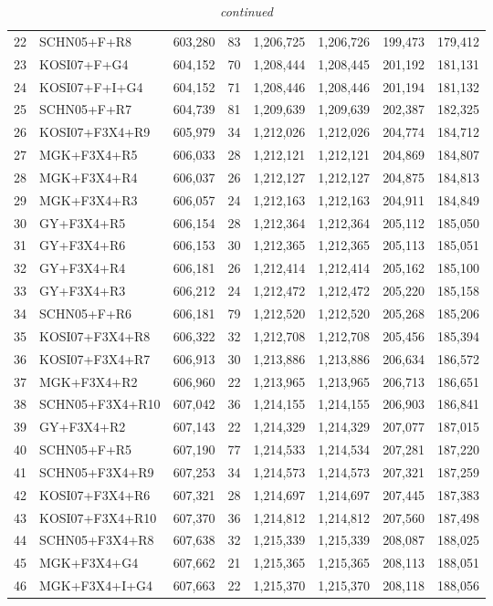 \begin{table}
\begin{longtable}{rlrrrrrr}
22&SCHN05+F+R8&603,280&83&1,206,725&1,206,726&199,473&179,412\\
23&KOSI07+F+G4&604,152&70&1,208,444&1,208,445&201,192&181,131\\
24&KOSI07+F+I+G4&604,152&71&1,208,446&1,208,446&201,194&181,132\\
25&SCHN05+F+R7&604,739&81&1,209,639&1,209,639&202,387&182,325\\
26&KOSI07+F3X4+R9&605,979&34&1,212,026&1,212,026&204,774&184,712\\
27&MGK+F3X4+R5&606,033&28&1,212,121&1,212,121&204,869&184,807\\
28&MGK+F3X4+R4&606,037&26&1,212,127&1,212,127&204,875&184,813\\
29&MGK+F3X4+R3&606,057&24&1,212,163&1,212,163&204,911&184,849\\
30&GY+F3X4+R5&606,154&28&1,212,364&1,212,364&205,112&185,050\\
\hline 
\caption[]{\emph{continued}}
31&GY+F3X4+R6&606,153&30&1,212,365&1,212,365&205,113&185,051\\
32&GY+F3X4+R4&606,181&26&1,212,414&1,212,414&205,162&185,100\\
33&GY+F3X4+R3&606,212&24&1,212,472&1,212,472&205,220&185,158\\
34&SCHN05+F+R6&606,181&79&1,212,520&1,212,520&205,268&185,206\\
35&KOSI07+F3X4+R8&606,322&32&1,212,708&1,212,708&205,456&185,394\\
36&KOSI07+F3X4+R7&606,913&30&1,213,886&1,213,886&206,634&186,572\\
37&MGK+F3X4+R2&606,960&22&1,213,965&1,213,965&206,713&186,651\\
38&SCHN05+F3X4+R10&607,042&36&1,214,155&1,214,155&206,903&186,841\\
39&GY+F3X4+R2&607,143&22&1,214,329&1,214,329&207,077&187,015\\
40&SCHN05+F+R5&607,190&77&1,214,533&1,214,534&207,281&187,220\\
41&SCHN05+F3X4+R9&607,253&34&1,214,573&1,214,573&207,321&187,259\\
42&KOSI07+F3X4+R6&607,321&28&1,214,697&1,214,697&207,445&187,383\\
43&KOSI07+F3X4+R10&607,370&36&1,214,812&1,214,812&207,560&187,498\\
44&SCHN05+F3X4+R8&607,638&32&1,215,339&1,215,339&208,087&188,025\\
45&MGK+F3X4+G4&607,662&21&1,215,365&1,215,365&208,113&188,051\\
46&MGK+F3X4+I+G4&607,663&22&1,215,370&1,215,370&208,118&188,056\\

\end{longtable}
\end{table}
